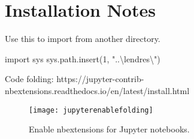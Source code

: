	\chapter{Installation Notes}

Use this to import from another directory.
	\begin{code}[\codenumbering]{}
		\codeitemnonumber import sys
		\codeitemnonumber sys.path.insert(1, "..\textbackslash{}lendres\textbackslash{}")
	\end{code}


Code folding:
https://jupyter-contrib-nbextensions.readthedocs.io/en/latest/install.html

	\begin{figure}[tbp]
		\centering
		\texttt{[image: jupyterenablefolding]}
		\caption{Enable nbextensions for Jupyter notebooks.}
		\label{fig:normaldistrution}
	\end{figure}
